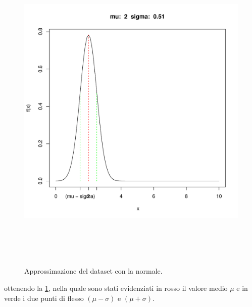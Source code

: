 \begin{figure}[!htb]
    \centering
    \includegraphics[height=16cm]{capitoli/images/1_introduzione/appross_dataset_norm.pdf}
    \caption{Approssimazione del dataset con la normale.}
    \label{app_data_norm}
\end{figure}

ottenendo la \ref{app_data_norm}, nella quale sono stati evidenziati in rosso il valore medio $\mu$ e in verde i due punti di flesso $(\mu - \sigma)$ e $(\mu + \sigma)$.







\newpage